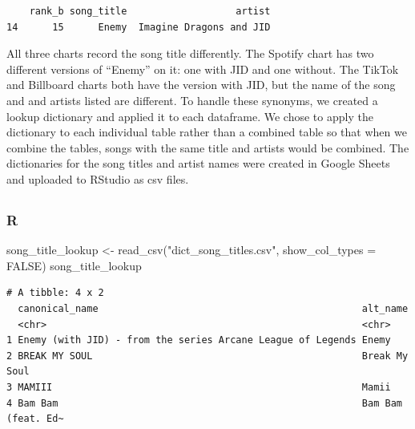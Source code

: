 \documentclass[
  letterpaper,
  DIV=11,
  numbers=noendperiod]{scrreprt}
\newenvironment{Shaded}{\begin{snugshade}}{\end{snugshade}}
\newcommand{\AttributeTok}[1]{\textcolor[rgb]{0.40,0.45,0.13}{#1}}
\newcommand{\ConstantTok}[1]{\textcolor[rgb]{0.56,0.35,0.01}{#1}}
\newcommand{\FunctionTok}[1]{\textcolor[rgb]{0.28,0.35,0.67}{#1}}
\newcommand{\NormalTok}[1]{\textcolor[rgb]{0.00,0.23,0.31}{#1}}
\newcommand{\OtherTok}[1]{\textcolor[rgb]{0.00,0.23,0.31}{#1}}
\newcommand{\StringTok}[1]{\textcolor[rgb]{0.13,0.47,0.30}{#1}}
\begin{document}
\begin{verbatim}
    rank_b song_title                   artist
14      15      Enemy  Imagine Dragons and JID
\end{verbatim}

All three charts record the song title differently. The Spotify chart
has two different versions of ``Enemy'' on it: one with JID and one
without. The TikTok and Billboard charts both have the version with JID,
but the name of the song and and artists listed are different. To handle
these synonyms, we created a lookup dictionary and applied it to each
dataframe. We chose to apply the dictionary to each individual table
rather than a combined table so that when we combine the tables, songs
with the same title and artists would be combined. The dictionaries for
the song titles and artist names were created in Google Sheets and
uploaded to RStudio as csv files.

\subsection*{}\label{section}

\subsubsection{R}

\begin{Shaded}
\begin{Highlighting}[]
\NormalTok{song\_title\_lookup }\OtherTok{\textless{}{-}} \FunctionTok{read\_csv}\NormalTok{(}\StringTok{"dict\_song\_titles.csv"}\NormalTok{, }\AttributeTok{show\_col\_types =} \ConstantTok{FALSE}\NormalTok{)}
\NormalTok{song\_title\_lookup}
\end{Highlighting}
\end{Shaded}

\begin{verbatim}
# A tibble: 4 x 2
  canonical_name                                              alt_name          
  <chr>                                                       <chr>             
1 Enemy (with JID) - from the series Arcane League of Legends Enemy             
2 BREAK MY SOUL                                               Break My Soul     
3 MAMIII                                                      Mamii             
4 Bam Bam                                                     Bam Bam (feat. Ed~
\end{verbatim}
\end{document}
